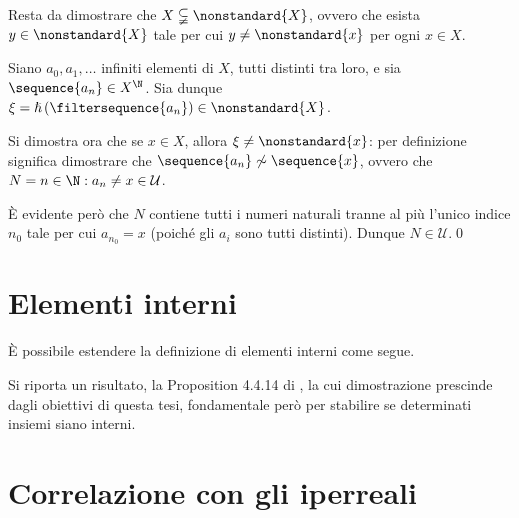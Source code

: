 {    Resta da dimostrare che $ X \subsetneqq \nonstandard{X} $, ovvero che esista $ y \in \nonstandard{X} $ tale per cui $ y\neq \nonstandard{x} $ per ogni $ x \in X $. 

    Siano $ a_0,a_1,\dots $ infiniti elementi di $ X $, tutti distinti tra loro, e sia $ \sequence{a_{n} } \in X^{\N} $. Sia dunque $ \xi = \hslash\left(\filtersequence{a_{n}}\right) \in \nonstandard{X} $.

    Si dimostra ora che se $ x \in X $, allora $ \xi\neq \nonstandard{x} $: per definizione significa dimostrare che $ \sequence{a_{n} }\mathrel{\not\sim} \sequence{x} $, ovvero che $ N={n \in \N: a_{n}\neq x } \in \mathcal{U} $. 

    È evidente però che $ N $ contiene tutti i numeri naturali tranne al più l'unico indice $ n_0 $ tale per cui $ a_{n_0}= x  $ (poiché gli $ a_i $ sono tutti distinti). Dunque $ N \in  \mathcal{U} $.\qed
}

\section{Elementi interni}

È possibile estendere la definizione di elementi interni come segue.



Si riporta un risultato, la Proposition 4.4.14 di \cite{chang_model_2012}, la cui dimostrazione prescinde dagli obiettivi di questa tesi, fondamentale però per stabilire se determinati insiemi siano interni. 


\section{Correlazione con gli iperreali}

